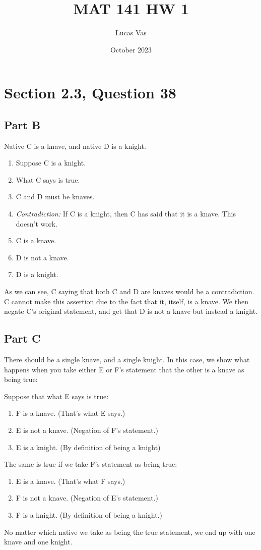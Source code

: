 \documentclass{article}
\title{MAT 141 HW 1}
\author{Lucas Vas}
\date{October 2023}
\begin{document}
\maketitle
\clearpage
\section{Section 2.3, Question 38}
\subsection{Part B}
Native C is a knave, and native D is a knight.
\begin{enumerate}
    \item Suppose C is a knight.
    \item What C says is true.
    \item C and D must be knaves.
    \item \textit{Contradiction:} If C is a knight, then C has said that it is a knave. This doesn't work.
    \item C is a knave.
    \item D is not a knave.
    \item D is a knight.
\end{enumerate}
As we can see, C saying that both C and D are knaves would be a contradiction. C cannot make this assertion due to the fact that it, itself, is a knave. We then negate C's original statement, and get that D is not a knave but instead a knight.

\subsection{Part C}
There should be a single knave, and a single knight. In this case, we show what happens when you take either E or F's statement that the other is a knave as being true:

Suppose that what E says is true:
\begin{enumerate}
    \item F is a knave. (That's what E says.)
    \item E is not a knave. (Negation of F's statement.)
    \item E is a knight. (By definition of being a knight)
\end{enumerate}
The same is true if we take F's statement as being true:
\begin{enumerate}
    \item E is a knave. (That's what F says.)
    \item F is not a knave. (Negation of E's statement.)
    \item F is a knight. (By definition of being a knight.)
\end{enumerate}
No matter which native we take as being the true statement, we end up with one knave and one knight.
\clearpage
\end{document}
